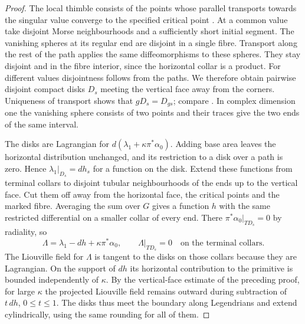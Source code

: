 \begin{proof}
The local thimble consists of the points whose parallel transports towards the singular value converge to the specified critical point \cite[Lemma~1.13]{Sei}. At a common value take disjoint Morse neighbourhoods and a sufficiently short initial segment. The vanishing spheres at its regular end are disjoint in a single fibre. Transport along the rest of the path applies the same diffeomorphisms to these spheres. They stay disjoint and in the fibre interior, since the horizontal collar is a product. For different values disjointness follows from the paths. We therefore obtain pairwise disjoint compact disks $D_s$ meeting the vertical face away from the corners. Uniqueness of transport shows that $g D_s=D_{gs}$; compare \cite[\S13.1]{CH}. In complex dimension one the vanishing sphere consists of two points and their traces give the two ends of the same interval.

The disks are Lagrangian for $d(\lambda_1+\kappa\pi^*\alpha_0)$. Adding base area leaves the horizontal distribution unchanged, and its restriction to a disk over a path is zero. Hence $\lambda_1|_{D_s}=dh_s$ for a function on the disk. Extend these functions from terminal collars to disjoint tubular neighbourhoods of the ends up to the vertical face. Cut them off away from the horizontal face, the critical points and the marked fibre. Averaging the sum over $G$ gives a function $h$ with the same restricted differential on a smaller collar of every end. There $\pi^*\alpha_0|_{TD_s}=0$ by radiality, so
\[
               \Lambda=\lambda_1-dh+\kappa\pi^*\alpha_0,\qquad
               \Lambda|_{TD_s}=0\quad\text{on the terminal collars}.
\]
The Liouville field for $\Lambda$ is tangent to the disks on those collars because they are Lagrangian. On the support of $dh$ its horizontal contribution to the primitive is bounded independently of $\kappa$. By the vertical-face estimate of the preceding proof, for large $\kappa$ the projected Liouville field remains outward during subtraction of $t\,dh$, $0\le t\le1$. The disks thus meet the boundary along Legendrians and extend cylindrically, using the same rounding for all of them.


\end{proof}
